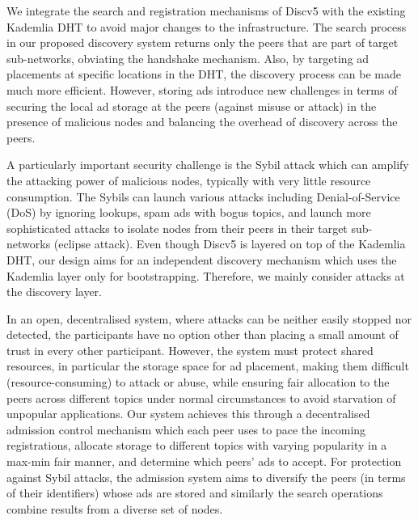 We integrate the search and registration mechanisms of Discv5 with the existing Kademlia DHT to avoid major changes to the infrastructure. The search process in our proposed discovery system returns only the peers that are part of target sub-networks, obviating the handshake mechanism. Also, by targeting ad placements at specific locations in the DHT, the discovery process can be made much more efficient. However, storing ads introduce new challenges in terms of securing the local ad storage at the peers (\ie against misuse or attack) in the presence of malicious nodes and balancing the overhead of discovery across the peers. 

A particularly important security challenge is the Sybil attack which can amplify the attacking power of malicious nodes, typically with very little resource consumption. The Sybils can launch various attacks including Denial-of-Service (DoS) by ignoring lookups, spam ads with bogus topics, and launch more sophisticated attacks to isolate nodes from their peers in their target sub-networks (\ie eclipse attack). Even though Discv5 is layered on top of the Kademlia DHT, our design aims for an independent discovery mechanism which uses the Kademlia layer only for bootstrapping. Therefore, we mainly consider attacks at the discovery layer.

In an open, decentralised system, where attacks can be neither easily stopped nor detected, the participants have no option other than placing a small amount of trust in every other participant. However, the system must protect shared resources, in particular the storage space for ad placement, making them difficult (\ie resource-consuming) to attack or abuse, while ensuring fair allocation to the peers across different topics under normal circumstances to avoid starvation of unpopular applications. Our system achieves this through a decentralised admission control mechanism which each peer uses to pace the incoming registrations, allocate storage to different topics with varying popularity in a max-min fair manner, and determine which peers' ads to accept. For protection against Sybil attacks, the admission system aims to diversify the peers (in terms of their identifiers) whose ads are stored and similarly the search operations combine results from a diverse set of nodes. 



